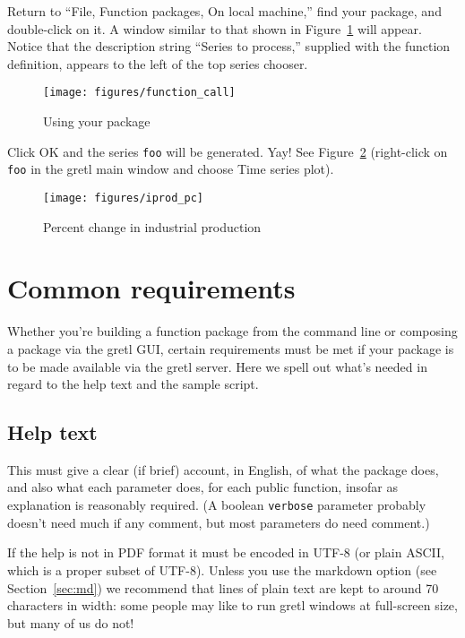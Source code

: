 \documentclass[oneside]{book}
\begin{document}
Return to ``File, Function packages, On local machine,'' find your
package, and double-click on it. A window similar to that shown in
Figure~\ref{fig:function_call} will appear.  Notice that the
description string ``Series to process,'' supplied with the function
definition, appears to the left of the top series chooser.

\begin{figure}[htbp]
  \centering
  \texttt{[image: figures/function\_call]}
  \caption{Using your package}
  \label{fig:function_call}
\end{figure}

Click \textsf{OK} and the series \texttt{foo} will be generated. Yay!
See Figure~\ref{fig:iprod_pc} (right-click on \texttt{foo} in the
gretl main window and choose \textsf{Time series plot}).

\begin{figure}[htbp]
  \centering
  \texttt{[image: figures/iprod\_pc]}
  \caption{Percent change in industrial production}
  \label{fig:iprod_pc}
\end{figure}

\section{Common requirements}
\label{sec:common-req}

Whether you're building a function package from the command line or
composing a package via the gretl GUI, certain requirements must be
met if your package is to be made available via the gretl server. Here
we spell out what's needed in regard to the help text and the sample
script.

\subsection{Help text}

This must give a clear (if brief) account, in English, of what the
package does, and also what each parameter does, for each public
function, insofar as explanation is reasonably required. (A boolean
\texttt{verbose} parameter probably doesn't need much if any comment,
but most parameters do need comment.)

If the help is not in PDF format it must be encoded in UTF-8 (or plain
ASCII, which is a proper subset of UTF-8). Unless you use the markdown
option (see Section~\ref{sec:md}) we recommend that lines of plain
text are kept to around 70 characters in width: some people may like
to run gretl windows at full-screen size, but many of us do not!
\end{document}
